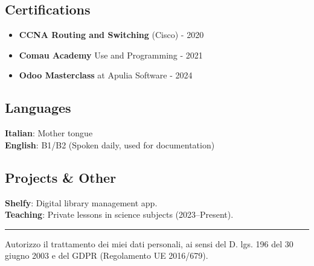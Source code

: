 \documentclass[11pt, a4paper]{article}
\begin{document}
\begin{minipage}[t]{\textwidth}
    \subsection*{Certifications}
    \begin{itemize}[noitemsep]
        \item \textbf{CCNA Routing and Switching} (Cisco) - 2020
        \item \textbf{Comau Academy} Use and Programming - 2021
        \item \textbf{Odoo Masterclass} at Apulia Software - 2024
    \end{itemize}
    \subsection*{Languages}
    \textbf{Italian}: Mother tongue \\
    \textbf{English}: B1/B2 (Spoken daily, used for documentation)
    
    \vspace{1em}
    \subsection*{Projects \& Other}
    \textbf{Shelfy}: Digital library management app. \\
    \textbf{Teaching}: Private lessons in science subjects (2023--Present).
\end{minipage}

\vfill
\hrule
\vspace{2mm}
{\centering \footnotesize \color{lightgrey} 
Autorizzo il trattamento dei miei dati personali, ai sensi del D. lgs. 196 del 30 giugno 2003 e del GDPR (Regolamento UE 2016/679). \par}
\end{document}
